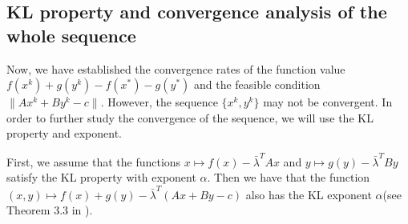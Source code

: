 \documentclass{article}
\numberwithin{equation}{section}
\begin{document}
\subsection{KL property and convergence analysis of the whole sequence}
Now, we have established the convergence rates of the function value $f(x^k)+ g(y^k) -f(x^*)- g(y^*)$ and the 
feasible condition $\|Ax^k + By^k - c\rVert$. However, the sequence $\{x^k,y^k\}$ may not be 
convergent. In order to further study the convergence of the sequence, we will use the KL property and
exponent. 

First, we assume that the functions $x \mapsto f(x) - \bar{\lambda}^TAx$ and $y\mapsto g(y) - \bar{\lambda}^TBy$ 
satisfy the KL property with exponent $\alpha$. Then we have that the function $(x,y) \mapsto f(x)+ g(y) -\bar{\lambda}^T(Ax+By-c)$ 
also has the KL exponent $\alpha$(see Theorem 3.3 in \cite{li2018calculus}). 
\end{document}
